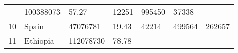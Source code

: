 \documentclass[
]{article}
\begin{document}
\begin{longtable}[]{@{}lllllll@{}}
\begin{minipage}[t]{0.15\columnwidth}
\end{minipage} & \begin{minipage}[t]{0.13\columnwidth}\raggedright
100388073\strut
\end{minipage} & \begin{minipage}[t]{0.13\columnwidth}\raggedright
57.27\strut
\end{minipage} & \begin{minipage}[t]{0.09\columnwidth}\raggedright
12251\strut
\end{minipage} & \begin{minipage}[t]{0.12\columnwidth}\raggedright
995450\strut
\end{minipage} & \begin{minipage}[t]{0.12\columnwidth}\raggedright
37338\strut
\end{minipage}\tabularnewline
\begin{minipage}[t]{0.06\columnwidth}\raggedright
10\strut
\end{minipage} & \begin{minipage}[t]{0.15\columnwidth}\raggedright
Spain\strut
\end{minipage} & \begin{minipage}[t]{0.13\columnwidth}\raggedright
47076781\strut
\end{minipage} & \begin{minipage}[t]{0.13\columnwidth}\raggedright
19.43\strut
\end{minipage} & \begin{minipage}[t]{0.09\columnwidth}\raggedright
42214\strut
\end{minipage} & \begin{minipage}[t]{0.12\columnwidth}\raggedright
499564\strut
\end{minipage} & \begin{minipage}[t]{0.12\columnwidth}\raggedright
262657\strut
\end{minipage}\tabularnewline
\begin{minipage}[t]{0.06\columnwidth}\raggedright
11\strut
\end{minipage} & \begin{minipage}[t]{0.15\columnwidth}\raggedright
Ethiopia\strut
\end{minipage} & \begin{minipage}[t]{0.13\columnwidth}\raggedright
112078730\strut
\end{minipage} & \begin{minipage}[t]{0.13\columnwidth}\raggedright
78.78\strut
\end{minipage} & \begin{minipage}[t]{0.09\columnwidth}\raggedright

\end{minipage}
\end{longtable}
\end{document}
